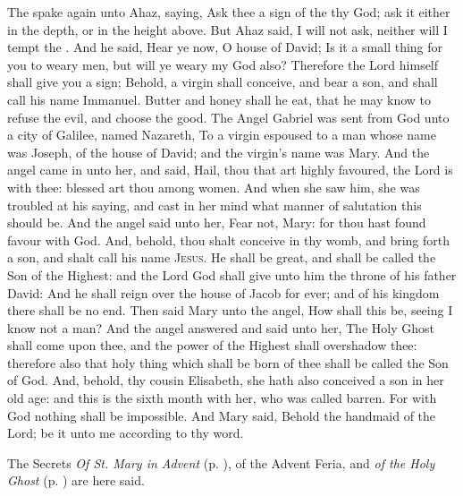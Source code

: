  The  spake again unto Ahaz, saying, Ask thee a sign of the  thy God; ask it either in the depth, or in the height above. But Ahaz said, I will not ask, neither will I tempt the . And he said, Hear ye now, O house of David; Is it a small thing for you to weary men, but will ye weary my God also? Therefore the Lord himself shall give you a sign; Behold, a virgin shall conceive, and bear a son, and shall call his name Immanuel. Butter and honey shall he eat, that he may know to refuse the evil, and choose the good.
 The Angel Gabriel was sent from God unto a city of Galilee, named Nazareth, To a virgin espoused to a man whose name was Joseph, of the house of David; and the virgin's name was Mary. And the angel came in unto her, and said, Hail, thou that art highly favoured, the Lord is with thee: blessed art thou among women. And when she saw him, she was troubled at his saying, and cast in her mind what manner of salutation this should be. And the angel said unto her, Fear not, Mary: for thou hast found favour with God. And, behold, thou shalt conceive in thy womb, and bring forth a son, and shalt call his name {\textsc{Jesus}}. He shall be great, and shall be called the Son of the Highest: and the Lord God shall give unto him the throne of his father David: And he shall reign over the house of Jacob for ever; and of his kingdom there shall be no end. Then said Mary unto the angel, How shall this be, seeing I know not a man? And the angel answered and said unto her, The Holy Ghost shall come upon thee, and the power of the Highest shall overshadow thee: therefore also that holy thing which shall be born of thee shall be called the Son of God. And, behold, thy cousin Elisabeth, she hath also conceived a son in her old age: and this is the sixth month with her, who was called barren. For with God nothing shall be impossible. And Mary said, Behold the handmaid of the Lord; be it unto me according to thy word.
\begin{rubric}
    The Secrets \emph{Of St. Mary in Advent} (p. \pageref{SPMaryInAdvent}), of the Advent Feria, and \emph{of the Holy Ghost} (p. \pageref{SPHolyGhost}) are here said.
\end{rubric}

